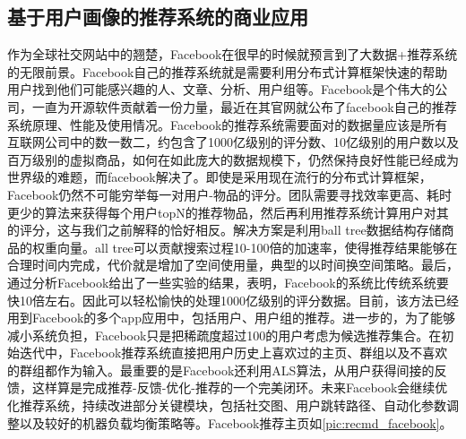 		\subsection{基于用户画像的推荐系统的商业应用}
		\begin{figure}
	    \centering
	      \label{pic:recmd_facebook}
	    \end{figure}
		作为全球社交网站中的翘楚，Facebook在很早的时候就预言到了大数据+推荐系统的无限前景。Facebook自己的推荐系统就是需要利用分布式计算框架快速的帮助用户找到他们可能感兴趣的人、文章、分析、用户组等。Facebook是个伟大的公司，一直为开源软件贡献着一份力量，最近在其官网就公布了facebook自己的推荐系统原理、性能及使用情况\citep{recmd-facebook}。Facebook的推荐系统需要面对的数据量应该是所有互联网公司中的数一数二，约包含了1000亿级别的评分数、10亿级别的用户数以及百万级别的虚拟商品，如何在如此庞大的数据规模下，仍然保持良好性能已经成为世界级的难题，而facebook解决了。即使是采用现在流行的分布式计算框架，Facebook仍然不可能穷举每一对用户-物品的评分。团队需要寻找效率更高、耗时更少的算法来获得每个用户topN的推荐物品，然后再利用推荐系统计算用户对其的评分，这与我们之前解释的恰好相反。解决方案是利用ball tree数据结构存储商品的权重向量。all tree可以贡献搜索过程10-100倍的加速率，使得推荐结果能够在合理时间内完成，代价就是增加了空间使用量，典型的以时间换空间策略。最后，通过分析Facebook给出了一些实验的结果，表明，Facebook的系统比传统系统要快10倍左右。因此可以轻松愉快的处理1000亿级别的评分数据。目前，该方法已经用到Facebook的多个app应用中，包括用户、用户组的推荐。进一步的，为了能够减小系统负担，Facebook只是把稀疏度超过100的用户考虑为候选推荐集合。在初始迭代中，Facebook推荐系统直接把用户历史上喜欢过的主页、群组以及不喜欢的群组都作为输入。最重要的是Facebook还利用ALS算法，从用户获得间接的反馈，这样算是完成推荐-反馈-优化-推荐的一个完美闭环。未来Facebook会继续优化推荐系统，持续改进部分关键模块，包括社交图、用户跳转路径、自动化参数调整以及较好的机器负载均衡策略等。Facebook推荐主页如\autoref{pic:recmd_facebook}。
		
